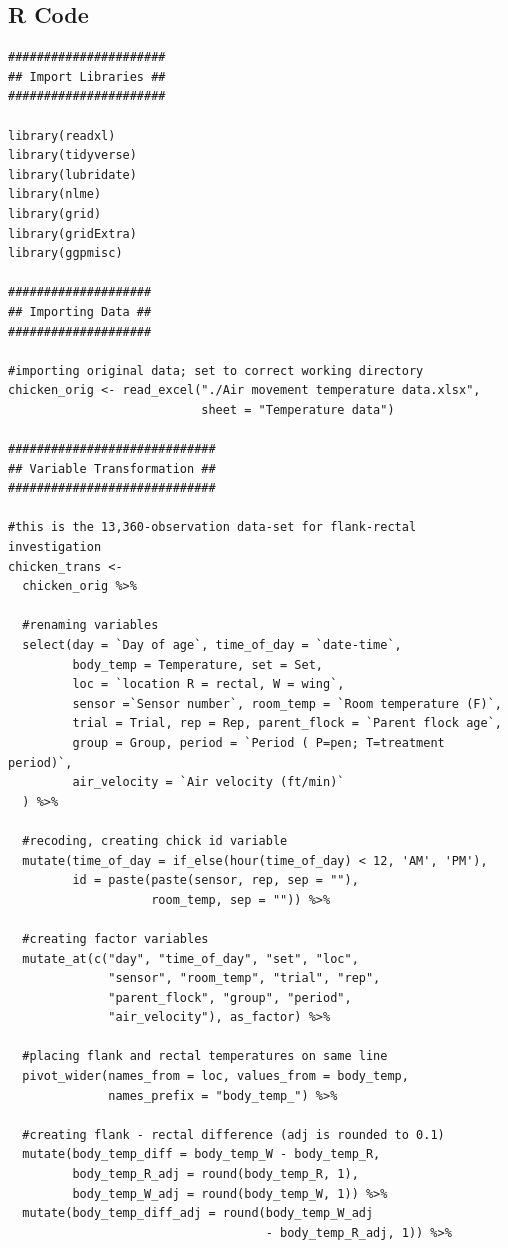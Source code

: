 \documentclass[a4paper, 10pt, titlepage]{article}
\begin{document}
\subsection{R Code}
\begin{lstlisting}[basicstyle = \footnotesize \ttfamily]
######################
## Import Libraries ##
######################

library(readxl)
library(tidyverse)
library(lubridate)
library(nlme)
library(grid)
library(gridExtra)
library(ggpmisc)

####################
## Importing Data ##
####################

#importing original data; set to correct working directory
chicken_orig <- read_excel("./Air movement temperature data.xlsx", 
                           sheet = "Temperature data")  

#############################
## Variable Transformation ##
#############################

#this is the 13,360-observation data-set for flank-rectal investigation
chicken_trans <-
  chicken_orig %>% 
  
  #renaming variables
  select(day = `Day of age`, time_of_day = `date-time`, 
         body_temp = Temperature, set = Set, 
         loc = `location R = rectal, W = wing`,
         sensor =`Sensor number`, room_temp = `Room temperature (F)`, 
         trial = Trial, rep = Rep, parent_flock = `Parent flock age`,
         group = Group, period = `Period ( P=pen; T=treatment period)`,
         air_velocity = `Air velocity (ft/min)`
  ) %>%
  
  #recoding, creating chick id variable
  mutate(time_of_day = if_else(hour(time_of_day) < 12, 'AM', 'PM'),
         id = paste(paste(sensor, rep, sep = ""), 
                    room_temp, sep = "")) %>% 
  
  #creating factor variables
  mutate_at(c("day", "time_of_day", "set", "loc", 
              "sensor", "room_temp", "trial", "rep", 
              "parent_flock", "group", "period", 
              "air_velocity"), as_factor) %>%
  
  #placing flank and rectal temperatures on same line
  pivot_wider(names_from = loc, values_from = body_temp, 
              names_prefix = "body_temp_") %>%
  
  #creating flank - rectal difference (adj is rounded to 0.1)
  mutate(body_temp_diff = body_temp_W - body_temp_R,
         body_temp_R_adj = round(body_temp_R, 1),
         body_temp_W_adj = round(body_temp_W, 1)) %>%  
  mutate(body_temp_diff_adj = round(body_temp_W_adj 
                                    - body_temp_R_adj, 1)) %>%
  

\end{lstlisting}
\end{document}
